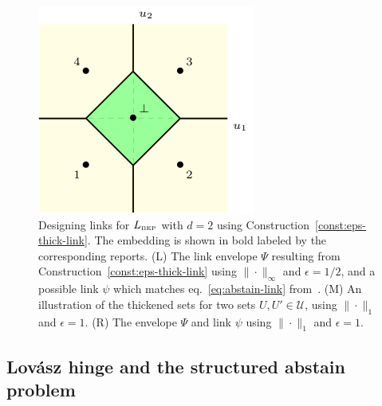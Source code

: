 \documentclass[twoside,11pt]{article}
\newcommand{\BEP}{L_{\text{\tiny BEP}}}
\newcommand{\U}{\mathcal{U}}
\begin{document}
\begin{figure}
\begin{center}
\begin{minipage}{0.32\linewidth}
\end{minipage}\hfill
\begin{minipage}{0.32\linewidth}
\includegraphics[width=\linewidth]{tikz/abstain-link-l1.pdf}
\end{minipage}\hfill
\caption{Designing links for $\BEP$ with $d=2$ using Construction~\ref{const:eps-thick-link}. The embedding is shown in bold labeled by the corresponding reports. (L) The link envelope $\Psi$ resulting from Construction~\ref{const:eps-thick-link} using $\|\cdot\|_\infty$ and $\epsilon = 1/2$, and a possible link $\psi$ which matches eq.~\eqref{eq:abstain-link} from~\cite{ramaswamy2018consistent}.  (M) An illustration of the thickened sets for two sets $U, U' \in \U$, using $\|\cdot\|_1$ and $\epsilon = 1$. (R) The envelope $\Psi$ and link $\psi$ %
  using $\|\cdot\|_1$ and $\epsilon = 1$.}
\label{fig:abstain-links}
\end{center}
\end{figure}


\subsection{Lov\'asz hinge and the structured abstain problem}
\label{sec:lovasz-hinge}

\newcommand{\dis}{\mathrm{dis}}
\newcommand{\abs}{\mathrm{abs}}
\end{document}
